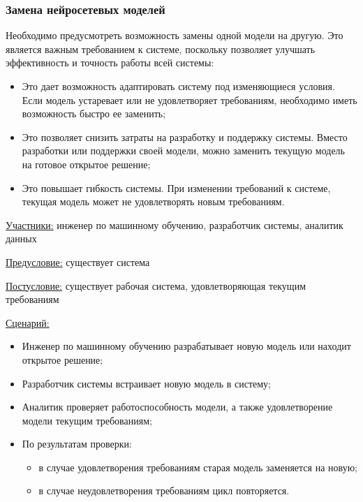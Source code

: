 \subsubsection{Замена нейросетевых моделей}

Необходимо предусмотреть возможность замены одной модели на другую. Это является важным требованием к системе, поскольку позволяет улучшать эффективность и точность работы всей системы:
\begin{itemize}
    \item Это дает возможность адаптировать систему под изменяющиеся условия. Если модель устаревает или не удовлетворяет требованиям, необходимо иметь возможность быстро ее заменить;
    \item Это позволяет снизить затраты на разработку и поддержку системы. Вместо разработки или поддержки своей модели, можно заменить текущую модель на готовое открытое решение;
    \item Это повышает гибкость системы. При изменении требований к системе, текущая модель может не удовлетворять новым требованиям.
\end{itemize}

\underline{Участники:} инженер по машинному обучению, разработчик системы, аналитик данных

\underline{Предусловие:} существует система

\underline{Постусловие:} существует рабочая система, удовлетворяющая текущим требованиям

\underline{Сценарий:}

\begin{itemize}
    \item Инженер по машинному обучению разрабатывает новую модель или находит открытое решение;
    \item Разработчик системы встраивает новую модель в систему;
    \item Аналитик проверяет работоспособность модели, а также удовлетворение модели текущим требованиям;
    \item По результатам проверки:
        \begin{itemize}
            \item в случае удовлетворения требованиям старая модель заменяется на новую;
            \item в случае неудовлетворения требованиям цикл повторяется.
        \end{itemize}
\end{itemize}